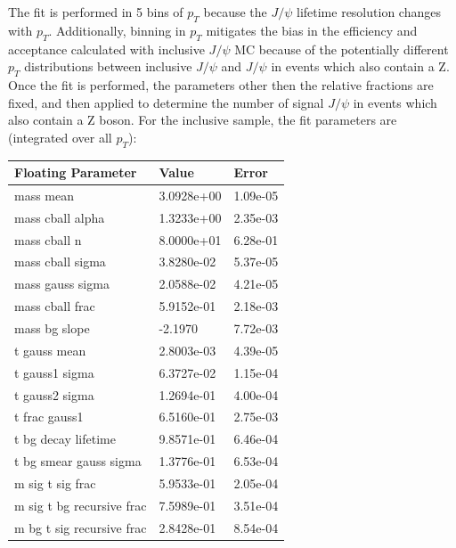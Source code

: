 \documentclass[a4paper,12pt]{article}
\begin{document}
The fit is performed in 5 bins of $p_{T}$ because the $J\slash \psi$ lifetime resolution changes with $p_{T}$. Additionally, binning in $p_T$ mitigates the bias in the efficiency and acceptance calculated with inclusive $J\slash \psi$ MC because of the potentially different $p_T$ distributions between inclusive $J\slash \psi$ and $J\slash \psi$ in events which also contain a Z. Once the fit is performed, the parameters other then the relative fractions are fixed, and then applied to determine the number of signal $J\slash \psi$ in events which also contain a Z boson. For the inclusive sample, the fit parameters are (integrated over all $p_{T}$):
\begin{center}
  \begin{tabular}{ | l | l | l | }
    \hline
    Floating Parameter        &  Value      & Error    \\ \hline
    mass mean                 &  3.0928e+00 & 1.09e-05 \\ \hline
    mass cball alpha          &  1.3233e+00 & 2.35e-03 \\ \hline
    mass cball n              &  8.0000e+01 & 6.28e-01 \\ \hline
    mass cball sigma          &  3.8280e-02 & 5.37e-05 \\ \hline
    mass gauss sigma          &  2.0588e-02 & 4.21e-05 \\ \hline
    mass cball frac           &  5.9152e-01 & 2.18e-03 \\ \hline
    mass bg slope             &  -2.1970    & 7.72e-03 \\ \hline
    t gauss mean              &  2.8003e-03 & 4.39e-05 \\ \hline
    t gauss1 sigma            &  6.3727e-02 & 1.15e-04 \\ \hline
    t gauss2 sigma            &  1.2694e-01 & 4.00e-04 \\ \hline
    t frac gauss1             &  6.5160e-01 & 2.75e-03 \\ \hline
    t bg decay lifetime       &  9.8571e-01 & 6.46e-04 \\ \hline
    t bg smear gauss sigma    &  1.3776e-01 & 6.53e-04 \\ \hline
    m sig t sig frac          &  5.9533e-01 & 2.05e-04 \\ \hline
    m sig t bg recursive frac &  7.5989e-01 & 3.51e-04 \\ \hline
    m bg t sig recursive frac &  2.8428e-01 & 8.54e-04 \\ \hline
    \hline
  \end{tabular}
\end{center}
\end{document}

